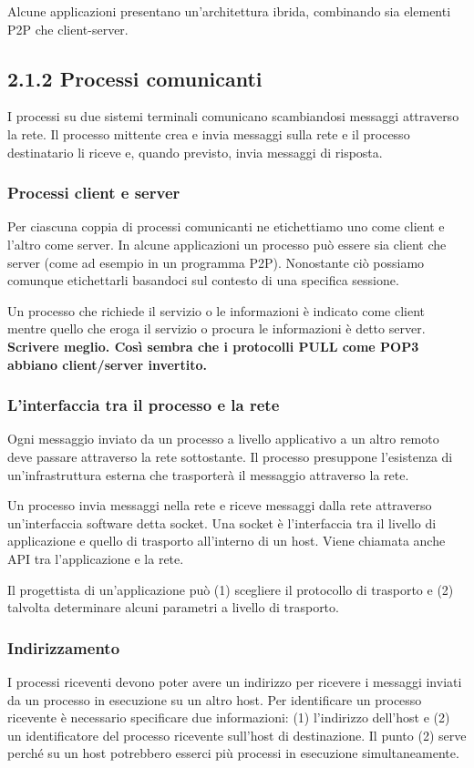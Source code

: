 \documentclass{book}
\begin{document}
Alcune applicazioni presentano un'architettura ibrida, combinando sia elementi P2P che client-server.

\subsection*{2.1.2 Processi comunicanti}
I processi su due sistemi terminali comunicano scambiandosi messaggi attraverso la rete. Il processo mittente crea e invia messaggi sulla rete e il processo destinatario li riceve e, quando previsto, invia messaggi di risposta.

\subsubsection*{Processi client e server}
Per ciascuna coppia di processi comunicanti ne etichettiamo uno come client e l'altro come server. In alcune applicazioni un processo può essere sia client che server (come ad esempio in un programma P2P). Nonostante ciò possiamo comunque etichettarli basandoci sul contesto di una specifica sessione.

Un processo che richiede il servizio o le informazioni è indicato come client mentre quello che eroga il servizio o procura le informazioni è detto server. \textbf{Scrivere meglio. Così sembra che i protocolli PULL come POP3 abbiano client/server invertito.}

\subsubsection*{L'interfaccia tra il processo e la rete}
Ogni messaggio inviato da un processo a livello applicativo a un altro remoto deve passare attraverso la rete sottostante. Il processo presuppone l'esistenza di un'infrastruttura esterna che trasporterà il messaggio attraverso la rete.

Un processo invia messaggi nella rete e riceve messaggi dalla rete attraverso un'interfaccia software detta socket. Una socket è l'interfaccia tra il livello di applicazione e quello di trasporto all'interno di un host. Viene chiamata anche API tra l'applicazione e la rete.

Il progettista di un'applicazione può (1) scegliere il protocollo di trasporto e (2) talvolta determinare alcuni parametri a livello di trasporto.

\subsubsection*{Indirizzamento}
I processi riceventi devono poter avere un indirizzo per ricevere i messaggi inviati da un processo in esecuzione su un altro host. Per identificare un processo ricevente è necessario specificare due informazioni: (1) l'indirizzo dell'host e (2) un identificatore del processo ricevente sull'host di destinazione. Il punto (2) serve perché su un host potrebbero esserci più processi in esecuzione simultaneamente.
\end{document}
